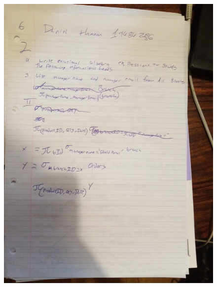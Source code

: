 \documentclass{article}
\begin{document}
	\begin{figure}
		\centering
		\includegraphics[width=\textwidth]{IMG_20210113_113141}
	\end{figure}
	\newpage
\end{document}
